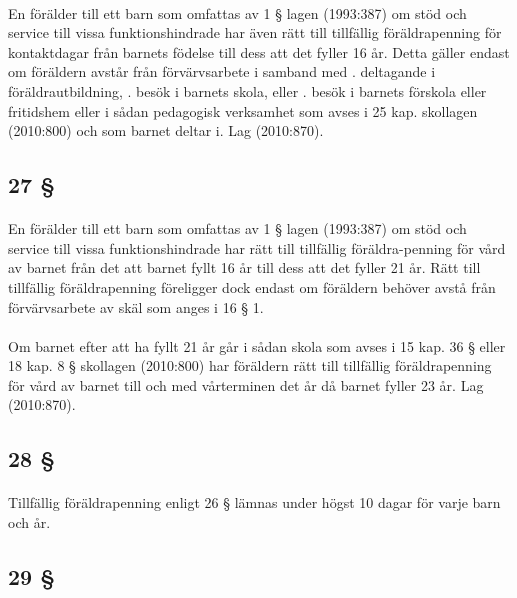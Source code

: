 \documentclass[a4paper,notitlepage,openany,10pt]{book}
\begin{document}
\paragraph*{}
En förälder till ett barn som omfattas av 1 § lagen (1993:387) om stöd och service till vissa funktionshindrade har även rätt till tillfällig föräldrapenning för kontaktdagar från barnets födelse till dess att det fyller 16 år. Detta gäller endast om föräldern avstår från förvärvsarbete i samband med
. deltagande i föräldrautbildning,
. besök i barnets skola, eller
. besök i barnets förskola eller fritidshem eller i sådan pedagogisk verksamhet som avses i 25 kap. skollagen (2010:800) och som barnet deltar i.
Lag (2010:870).
\subsection*{27 §}
\paragraph*{}
En förälder till ett barn som omfattas av 1 § lagen (1993:387) om stöd och service till vissa funktionshindrade har rätt till tillfällig föräldra-penning för vård av barnet från det att barnet fyllt 16 år till dess att det fyller 21 år. Rätt till tillfällig föräldrapenning föreligger dock endast om föräldern behöver avstå från förvärvsarbete av skäl som anges i 16 § 1.
\paragraph*{}
Om barnet efter att ha fyllt 21 år går i sådan skola som avses i 15 kap. 36 § eller 18 kap. 8 § skollagen (2010:800) har föräldern rätt till tillfällig föräldrapenning för vård av barnet till och med vårterminen det år då barnet fyller 23 år.
Lag (2010:870).
\subsection*{28 §}
\paragraph*{}
Tillfällig föräldrapenning enligt 26 § lämnas under högst 10 dagar för varje barn och år.
\subsection*{29 §}
\end{document}
